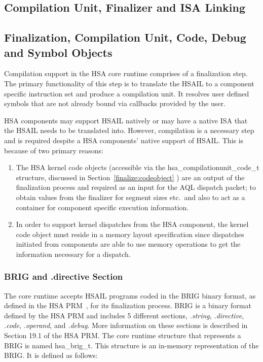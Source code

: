 \documentclass{book}
\newcommand{\reftyp}[1]{#1}
\begin{document}
\begin{appendices}

\chapter{Compilation Unit, Finalizer and ISA Linking}
\label{finalizerchapter} \hypertarget{finalizerchapter}{}
\hypertarget{finalizer}{}\section{Finalization, Compilation Unit,
Code, Debug and Symbol Objects}\label{finalizer}

Compilation support in the HSA core runtime comprises of a
finalization step. The primary functionality of this step is to
translate the HSAIL to a component specific instruction set and
produce a compilation unit. It resolves user defined symbols that
are not already bound via callbacks provided by the user.

HSA components may support HSAIL natively or may have a native ISA
that the HSAIL needs to be translated into. However, compilation is a
necessary step and is required despite a HSA components' native support
of HSAIL. This is because of two primary reasons:

\begin{enumerate}
\item  The HSA kernel code objects (accessible via the
\reftyp{hsa\_compilationunit\_code\_t} structure, discussed in
Section~\ref{finalize:codeobject} ) are an output of the
finalization process and required as an input for the AQL dispatch
packet; to obtain values from the finalizer for segment sizes etc.\
and also to act as a container for component specific execution
information.

\item In order to support kernel dispatches from the HSA
component, the kernel code object must reside in a memory layout
specification since dispatches initiated from components are able
to use memory operations to get the information necessary for a
dispatch.
\end{enumerate}

\subsection{BRIG and .directive Section}
The core runtime accepts HSAIL programs coded in the
BRIG binary format, as defined in the HSA PRM~\cite{prm}, for its
finalization process. BRIG is a binary format defined by the HSA
PRM and includes 5 different sections, \emph{.string},
\emph{.directive}, \emph{.code}, \emph{.operand}, and \emph{.debug}.
More information on these sections is described in Section 19.1 of
the HSA PRM. The core runtime structure that represents a
BRIG is named \reftyp{hsa\_brig\_t}. This structure is an in-memory
representation of the BRIG. It is defined as follows:


\end{appendices}
\end{document}
